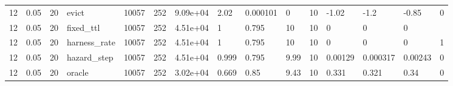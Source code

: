 \begin{tabular}{lllllllllllllll}
12 & 0.05 & 20 & evict & 10057 & 252 & 9.09e+04 & 2.02 & 0.000101 & 0 & 10 & -1.02 & -1.2 & -0.85 & 0 \\
12 & 0.05 & 20 & fixed\_ttl & 10057 & 252 & 4.51e+04 & 1 & 0.795 & 10 & 10 & 0 & 0 & 0 &  \\
12 & 0.05 & 20 & harness\_rate & 10057 & 252 & 4.51e+04 & 1 & 0.795 & 10 & 10 & 0 & 0 & 0 & 1 \\
12 & 0.05 & 20 & hazard\_step & 10057 & 252 & 4.51e+04 & 0.999 & 0.795 & 9.99 & 10 & 0.00129 & 0.000317 & 0.00243 & 0 \\
12 & 0.05 & 20 & oracle & 10057 & 252 & 3.02e+04 & 0.669 & 0.85 & 9.43 & 10 & 0.331 & 0.321 & 0.34 & 0 \\
\bottomrule
\end{tabular}